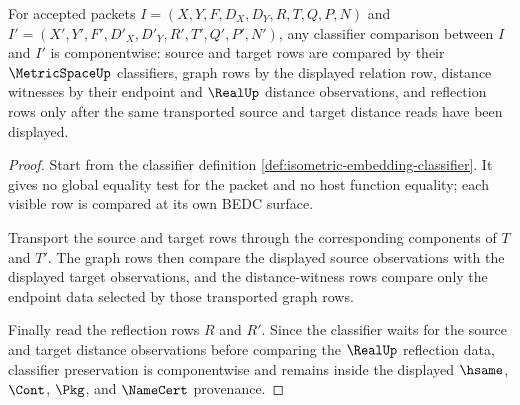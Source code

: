 \begin{theorem}
\label{thm:isometric-embedding-classifier-transport}
For accepted packets $I=(X,Y,F,D_X,D_Y,R,T,Q,P,N)$ and $I'=(X',Y',F',D'_X,D'_Y,R',T',Q',P',N')$, any classifier comparison between $I$ and $I'$ is componentwise: source and target rows are compared by their $\MetricSpaceUp$ classifiers, graph rows by the displayed relation row, distance witnesses by their endpoint and $\RealUp$ distance observations, and reflection rows only after the same transported source and target distance reads have been displayed.
\end{theorem}
\begin{proof}
Start from the classifier definition \autoref{def:isometric-embedding-classifier}. It gives no global equality test for the packet and no host function equality; each visible row is compared at its own BEDC surface.

Transport the source and target rows through the corresponding components of $T$ and $T'$. The graph rows then compare the displayed source observations with the displayed target observations, and the distance-witness rows compare only the endpoint data selected by those transported graph rows.

Finally read the reflection rows $R$ and $R'$. Since the classifier waits for the source and target distance observations before comparing the $\RealUp$ reflection data, classifier preservation is componentwise and remains inside the displayed $\hsame$, $\Cont$, $\Pkg$, and $\NameCert$ provenance.
\end{proof}

